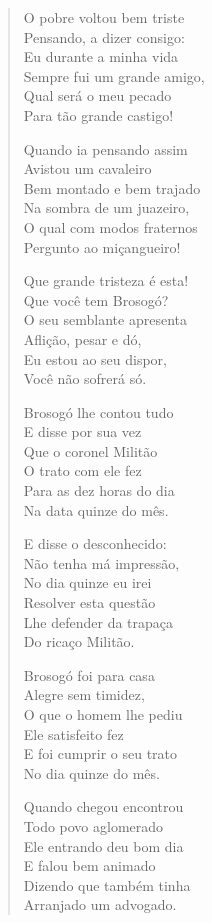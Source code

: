\begin{verse}
O pobre voltou bem triste\\
Pensando, a dizer consigo:\\
Eu durante a minha vida\\
Sempre fui um grande amigo,\\
Qual será o meu pecado\\
Para tão grande castigo!

Quando ia pensando assim\\
Avistou um cavaleiro\\
Bem montado e bem trajado\\
Na sombra de um juazeiro,\\
O qual com modos fraternos\\
Pergunto ao miçangueiro!

Que grande tristeza é esta!\\
Que você tem Brosogó?\\
O seu semblante apresenta\\
Aflição, pesar e dó,\\
Eu estou ao seu dispor,\\
Você não sofrerá só.

Brosogó lhe contou tudo\\
E disse por sua vez\\
Que o coronel Militão\\
O trato com ele fez\\
Para as dez horas do dia\\
Na data quinze do mês.

E disse o desconhecido:\\
Não tenha má impressão,\\
No dia quinze eu irei\\
Resolver esta questão\\
Lhe defender da trapaça\\
Do ricaço Militão.

Brosogó foi para casa\\
Alegre sem timidez,\\
O que o homem lhe pediu\\
Ele satisfeito fez\\
E foi cumprir o seu trato\\
No dia quinze do mês.

Quando chegou encontrou\\
Todo povo aglomerado\\
Ele entrando deu bom dia\\
E falou bem animado\\
Dizendo que também tinha\\
Arranjado um advogado.


\end{verse}
